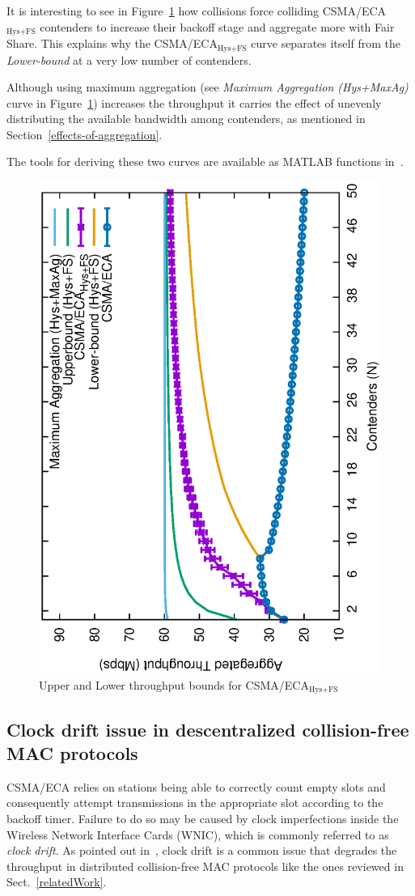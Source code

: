 	It is interesting to see in Figure~\ref{fig:ECA-bounds-comparison} how collisions force colliding CSMA/ECA$_{\text{Hys+FS}}$ contenders to increase their backoff stage and aggregate more with Fair Share. This explains why the CSMA/ECA$_{\text{Hys+FS}}$ curve separates itself from the \emph{Lower-bound} at a very low number of contenders. 
	
	Although using maximum aggregation (see \emph{Maximum Aggregation (Hys+MaxAg)} curve in Figure~\ref{fig:ECA-bounds-comparison}) increases the throughput it carries the effect of unevenly distributing the available bandwidth among contenders, as mentioned in Section~\ref{effects-of-aggregation}.
	
	The tools for deriving these two curves are available as MATLAB functions in~\cite{ECA-bounds-example}. 
	
	\begin{figure}[tb]
	\centering
		\includegraphics[width=0.7\linewidth,angle=-90]{figures/throughput-w-model/throughput-combined-w-model-TON.eps}
		\caption{Upper and Lower throughput bounds for CSMA/ECA$_{\text{Hys+FS}}$}
		\label{fig:ECA-bounds-comparison}
	\end{figure}
	
	\subsection{Clock drift issue in descentralized collision-free MAC protocols}\label{clockDrift-issue}
	CSMA/ECA relies on stations being able to correctly count empty slots and consequently attempt transmissions in the appropriate slot according to the backoff timer. Failure to do so may be caused by clock imperfections inside the Wireless Network Interface Cards (WNIC), which is commonly referred to as \emph{clock drift}. As pointed out in~\cite{slotDrift}, clock drift is a common issue that degrades the throughput in distributed collision-free MAC protocols like the ones reviewed in Sect.~\ref{relatedWork}.
	
